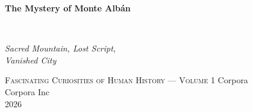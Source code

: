 \clearpage
\vspace*{1.5in}
\begin{center}
  \begin{minipage}{\textwidth}
    \centering
    \Huge\bfseries
    \linespread{1.25}\selectfont
    The Mystery of Monte Albán
  \end{minipage}
  \\[3em]
  {\Large\itshape\linespread{1.3}\selectfont
  Sacred Mountain, Lost Script,\\
  Vanished City\par}
  \vspace{2em}
  {\small\scshape Fascinating Curiosities of Human History — Volume 1}
  \vfill
  {\large Corpora}
  \\[1em]
  {\large Corpora Inc}
  \\[1em]
  {\large 2026}
\end{center}
\clearpage
